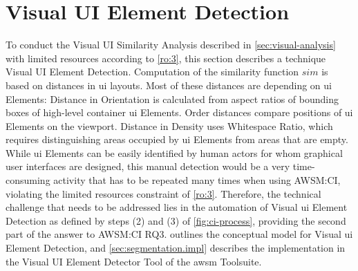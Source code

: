 \vspace{-10pt}
\hypertarget{sec:segmentation}{%
\section{Visual UI Element Detection}\label{sec:segmentation}}
\vspace{20pt}

To conduct the Visual UI Similarity Analysis described in \cref{sec:visual-analysis} with limited resources according to \cref{ro:3}, this section describes a technique Visual UI Element Detection.
Computation of the similarity function \(sim\) is based on distances in \gls{ui} layouts.
Most of these distances are depending on \gls{ui} Elements:
Distance in Orientation is calculated from aspect ratios of bounding boxes of high-level container \gls{ui} Elements.
Order distances compare positions of \gls{ui} Elements on the viewport.
Distance in Density uses Whitespace Ratio, which requires distinguishing areas occupied by \gls{ui} Elements from areas that are empty.
While \gls{ui} Elements can be easily identified by human actors for whom graphical user interfaces are designed, this manual detection would be a very time-consuming activity that has to be repeated many times when using AWSM:CI, violating the limited resources constraint of \cref{ro:3}.
Therefore, the technical challenge that needs to be addressed lies in the automation of Visual \gls{ui} Element Detection as defined by steps (2) and (3) of \cref{fig:ci-process}, providing the second part of the answer to AWSM:CI RQ3.
 outlines the conceptual model for Visual \gls{ui} Element Detection, and \cref{sec:segmentation.impl} describes the implementation in the Visual UI Element Detector Tool of the \gls{awsm} Toolsuite.

